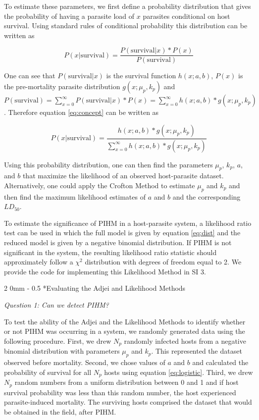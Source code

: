 \documentclass[12pt, a4paper]{article}
\makeatletter
\renewcommand{\subsection}{\@startsection
{subsection}%
{2}%
{0mm}%
{-\baselineskip}%
{0.5\baselineskip}%
{\normalfont\bf}} %
\makeatother
\begin{document}
To estimate these parameters, we first define a probability distribution that gives the probability of having a parasite load of $x$ parasites conditional on host survival.  Using standard rules of conditional probability this distribution can be written as

\begin{equation}
    P(x | \text{survival}) = \dfrac{P(\text{survival} | x) * P(x)}{P(\text{survival})}
    \label{eq:concept}
\end{equation}

One can see that $P(\text{survival} | x)$ is the survival function $h(x; a, b)$, $P(x)$ is the pre-mortality parasite distribution $g(x; \mu_p, k_p)$ and $P(\text{survival}) = \sum_{x=0}^{\infty} P(\text{survival} | x) * P(x) =  \sum_{x=0}^{\infty} h(x; a, b)  * g(x; \mu_p, k_p)$. Therefore equation \ref{eq:concept} can be written as

\begin{equation}
    P(x | \text{survival}) = \dfrac{h(x; a, b)  * g(x; \mu_p, k_p)}{\sum_{x=0}^{\infty} h(x; a, b)  * g(x; \mu_p, k_p)}
    \label{eq:dist}
\end{equation}

Using this probability distribution, one can then find the parameters $\mu_p$, $k_p$, $a$, and $b$ that maximize the likelihood of an observed host-parasite dataset. Alternatively, one could apply the Crofton Method to estimate $\mu_p$ and $k_p$ and then find the maximum likelihood estimates of $a$ and $b$ and the corresponding $LD_{50}$.

To estimate the significance of PIHM in a host-parasite system, a
likelihood ratio test can be used in which the full model is given by equation
\ref{eq:dist} and the reduced model is given by a negative binomial
distribution.  If PIHM is not significant in the system, the resulting likelihood
ratio statistic should approximately follow a $\chi^2$ distribution with degrees of freedom equal to 2.  We provide the code for implementing this Likelihood Method in SI 3.

\subsection*{Evaluating the Adjei and Likelihood Methods}

\emph{Question 1: Can we detect PIHM?}

To test the ability of the Adjei and the Likelihood Methods to identify whether or not PIHM was occurring in a system, we randomly generated data using the following procedure.  First, we drew $N_p$ randomly infected hosts from a
negative binomial distribution with parameters $\mu_p$ and $k_p$.  This represented the dataset observed before mortality. Second, we chose values of $a$ and $b$ and calculated the probability of survival
for all $N_p$ hosts using equation \ref{eq:logistic}.  Third, we drew $N_p$ random numbers from a uniform distribution
between 0 and 1 and if host survival probability was less than this random
number, the host experienced parasite-induced mortality.  The surviving
hosts comprised the dataset that would be obtained in the field, after PIHM.
\end{document}
